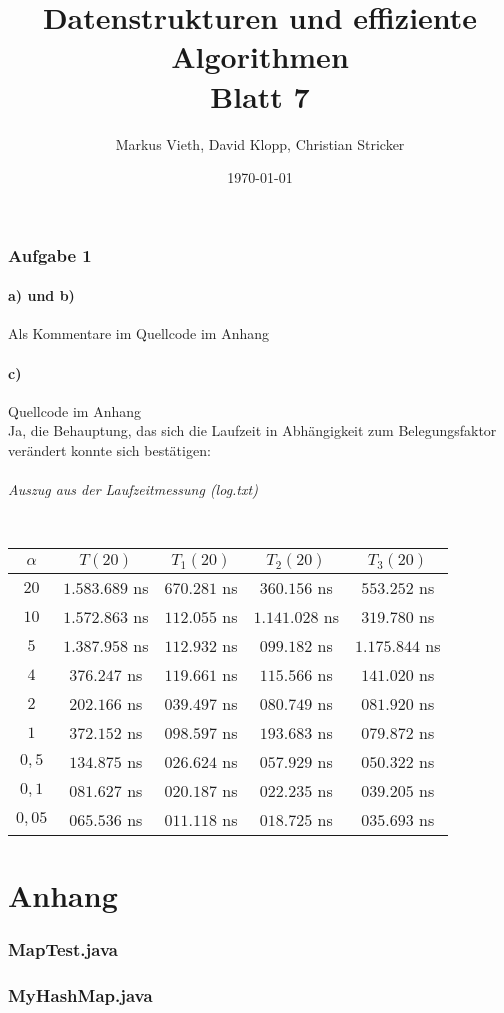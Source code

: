 \documentclass[a4paper,11pt,twoside]{article}
\title{Datenstrukturen und effiziente Algorithmen\\ Blatt 7}
\author{Markus Vieth, David Klopp, Christian Stricker}
\date{\today}
\begin{document}
\maketitle
\cleardoublepage
\pagestyle{myheadings}

\section*{Aufgabe 1}
\subsection*{a) und b)}
Als Kommentare im Quellcode im Anhang
\subsection*{c)}
Quellcode im Anhang\\
Ja, die Behauptung, das sich die Laufzeit in Abhängigkeit zum Belegungsfaktor verändert konnte sich bestätigen:
\paragraph*{Auszug aus der Laufzeitmessung (log.txt)}$~$\\
\begin{tabular}{c|c|c|c|c}
	$\alpha$ & $T(20)$ & $T_1(20)$& $T_2(20)$& $T_3(20)$ \\ \hline
	$20$&$1.583.689$ ns&$ 670.281$ ns&$ 360.156$ ns&$ 553.252$ ns \\
	$10$&$1.572.863$ ns&$ 112.055$ ns&$ 1.141.028$ ns&$ 319.780$ ns\\
	$5$&$1.387.958$ ns&$ 112.932$ ns&$ 099.182$ ns&$ 1.175.844$ ns\\
	$4$&$376.247$ ns&$ 119.661$ ns&$ 115.566$ ns&$ 141.020$ ns\\ \hline
	$2$&$202.166$ ns&$ 039.497$ ns&$ 080.749$ ns&$ 081.920$ ns\\
	$1$&$372.152$ ns&$ 098.597$ ns&$ 193.683$ ns&$ 079.872$ ns\\
	$0,5$&$134.875$ ns&$ 026.624$ ns&$ 057.929$ ns&$ 050.322$ ns\\
	$0,1$&$081.627$ ns&$ 020.187$ ns&$ 022.235$ ns&$ 039.205$ ns\\ \hline
	$0,05$&$065.536$ ns&$ 011.118$ ns&$ 018.725$ ns&$ 035.693$ ns\\
\end{tabular}
\clearpage
\part*{Anhang}
\section{MapTest.java}

\section{MyHashMap.java}

\end{document}
